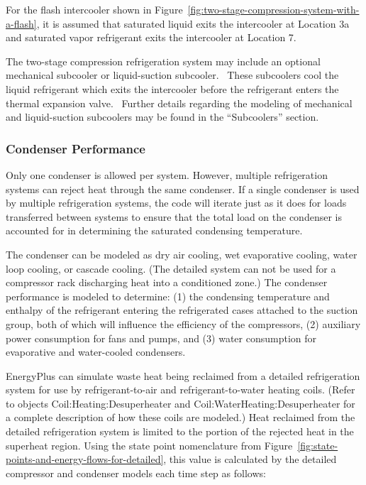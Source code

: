 For the flash intercooler shown in Figure~\ref{fig:two-stage-compression-system-with-a-flash}, it is assumed that saturated liquid exits the intercooler at Location 3a and saturated vapor refrigerant exits the intercooler at Location 7.

The two-stage compression refrigeration system may include an optional mechanical subcooler or liquid-suction subcooler.~ These subcoolers cool the liquid refrigerant which exits the intercooler before the refrigerant enters the thermal expansion valve.~ Further details regarding the modeling of mechanical and liquid-suction subcoolers may be found in the ``Subcoolers'' section.

\subsubsection{Condenser Performance}\label{condenser-performance}

Only one condenser is allowed per system. However, multiple refrigeration systems can reject heat through the same condenser. If a single condenser is used by multiple refrigeration systems, the code will iterate just as it does for loads transferred between systems to ensure that the total load on the condenser is accounted for in determining the saturated condensing temperature.

The condenser can be modeled as dry air cooling, wet evaporative cooling, water loop cooling, or cascade cooling. (The detailed system can not be used for a compressor rack discharging heat into a conditioned zone.) The condenser performance is modeled to determine: (1) the condensing temperature and enthalpy of the refrigerant entering the refrigerated cases attached to the suction group, both of which will influence the efficiency of the compressors, (2) auxiliary power consumption for fans and pumps, and (3) water consumption for evaporative and water-cooled condensers.

EnergyPlus can simulate waste heat being reclaimed from a detailed refrigeration system for use by refrigerant-to-air and refrigerant-to-water heating coils. (Refer to objects Coil:Heating:Desuperheater and Coil:WaterHeating:Desuperheater for a complete description of how these coils are modeled.) Heat reclaimed from the detailed refrigeration system is limited to the portion of the rejected heat in the superheat region. Using the state point nomenclature from Figure~\ref{fig:state-points-and-energy-flows-for-detailed}, this value is calculated by the detailed compressor and condenser models each time step as follows:

